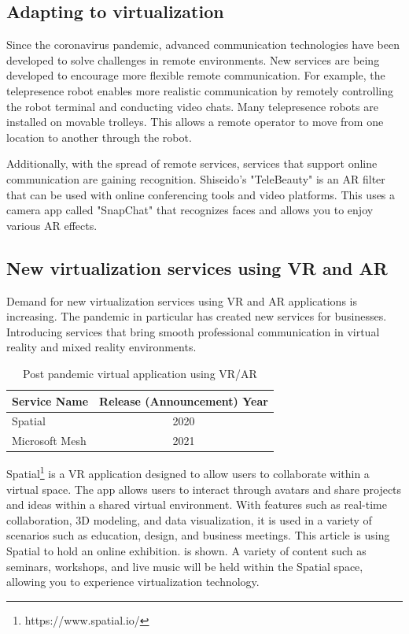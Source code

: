 \documentclass[12pt]{article}
\begin{document}
\subsection{Adapting to virtualization}
Since the coronavirus pandemic, advanced communication technologies have been
developed to solve challenges in remote environments. New services are being
developed to encourage more flexible remote communication. For example, the
telepresence robot \cite{telepresence_robot}
enables more realistic communication by remotely controlling the robot terminal
and conducting video chats. Many telepresence robots are installed on movable
trolleys. This allows a remote operator to move from one location to another
through the robot.

Additionally, with the spread of remote services, services that support online
communication are gaining recognition. Shiseido's "TeleBeauty"
\cite{telebeauty} is
an AR filter that can
be used with online conferencing tools and video platforms. This uses a camera
app called "SnapChat" that recognizes faces and allows you to enjoy various AR
effects.

\subsection{New virtualization services using VR and AR}
Demand for new virtualization services using VR and AR applications is
increasing. The pandemic in particular has
created new services for businesses. Introducing services that bring smooth
professional communication in virtual reality and mixed reality environments.

\begin{table}[h]
    \begin{center}
        \begin{tabular}{|l|c|} \hline
            Service Name   & Release (Announcement) Year \\ \hline
            Spatial        & 2020                        \\
            Microsoft Mesh & 2021                        \\ \hline
        \end{tabular}
        \caption{Post pandemic virtual application using VR/AR}
    \end{center}
\end{table}

Spatial\footnote{https://www.spatial.io/} is a VR application designed to allow
users to collaborate within a
virtual space. The app allows users to interact through avatars and share
projects and ideas within a shared virtual environment. With features such as
real-time collaboration, 3D modeling, and data visualization, it is used in a
variety of scenarios such as education, design, and business meetings. This
article \cite{spatial_example} is using Spatial to hold an online exhibition.
is shown.
A variety of content
such as seminars, workshops, and live music will be held within the Spatial
space, allowing you to experience virtualization technology.
\end{document}

